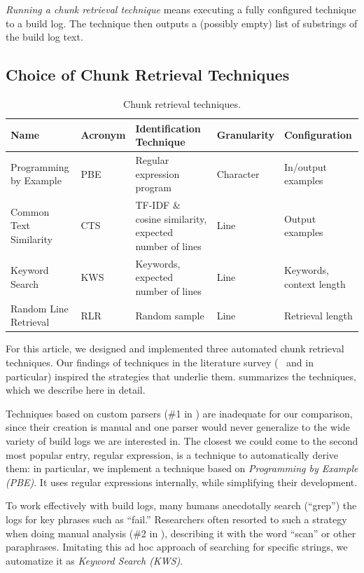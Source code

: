 \documentclass[10pt,journal,compsoc]{IEEEtran}
\begin{document}
\emph{Running a
chunk retrieval technique} means
executing a fully configured
technique to a build log.
The technique then outputs a (possibly empty) list of substrings of the
build log text.

\subsection{Choice of Chunk Retrieval Techniques}
\label{sec:choice}

\begin{table}[htb]
\centering
\caption{Chunk retrieval techniques.}
\begin{tabularx}{\textwidth}{@{}llXll@{}}
\toprule
Name & Acronym & Identification Technique & Granularity &
Configuration \\
\midrule
Programming by Example & PBE	 & Regular expression program
& Character   & In/output examples	\\
Common Text Similarity	     & CTS     & TF-IDF \& cosine similarity,
expected number of lines & Line        & Output examples	   \\
Keyword Search		     & KWS     & Keywords, expected number of
lines			 & Line        & Keywords, context length  \\
Random Line Retrieval	     & RLR     & Random sample
& Line	      & Retrieval length	  \\
\bottomrule
\end{tabularx}
\label{tab:techniques}
\end{table}


For this article, we designed and implemented three automated chunk
retrieval techniques.
Our findings of techniques in the literature
survey (~ and  in
particular) inspired the strategies that underlie them.
 summarizes the techniques, which we describe here
in detail.

Techniques based on custom parsers (\#1
in ) are inadequate for our comparison,
since their creation is manual and one parser would never generalize
to the wide variety of build logs we are interested in.
The closest
we could come to the second most popular entry, regular expression, is
a technique to automatically derive them: in particular, we implement
a technique based on
\emph{Programming by Example (PBE)}.
It uses regular expressions internally, while simplifying their
development.

To work effectively with build logs, many humans anecdotally search
(``grep'') the logs for key phrases such as ``fail.'' Researchers often
resorted to such a strategy when doing manual analysis (\#2
in ), describing it with the word ``scan''
or other paraphrases.
Imitating this ad hoc approach of searching for
specific strings, we automatize it as \emph{Keyword Search (KWS)}.
\end{document}
